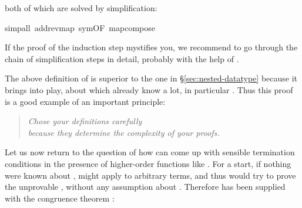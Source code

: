 \begin{isabelle}
\begin{isamarkuptxt}
\begin{quote}
\end{quote}
both of which are solved by simplification:%
\end{isamarkuptxt}%
simp{\isacharunderscore}all\ add{\isacharcolon}rev{\isacharunderscore}map\ sym{\isacharbrackleft}OF\ map{\isacharunderscore}compose{\isacharbrackright}{\isacharparenright}%
\begin{isamarkuptext}%
\noindent
If the proof of the induction step mystifies you, we recommend to go through
the chain of simplification steps in detail, probably with the help of
.

The above definition of  is superior to the one in \S\ref{sec:nested-datatype}
because it brings  into play, about which already know a lot, in particular
.
Thus this proof is a good example of an important principle:
\begin{quote}
\emph{Chose your definitions carefully\\
because they determine the complexity of your proofs.}
\end{quote}

Let us now return to the question of how  can come up with
sensible termination conditions in the presence of higher-order functions
like . For a start, if nothing were known about ,
 might apply  to arbitrary terms, and thus
 would try to prove the unprovable , without any assumption about .  Therefore
 has been supplied with the congruence theorem
:
\begin{quote}


\end{quote}
\end{isamarkuptext}
\end{isabelle}
